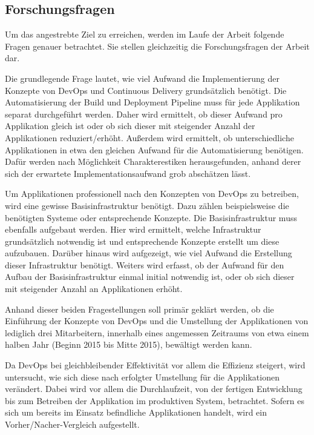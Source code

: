 \subsection{Forschungsfragen}
\label{sec:forschungsfragen}
Um das angestrebte Ziel zu erreichen, werden im Laufe der Arbeit folgende Fragen genauer betrachtet. Sie stellen gleichzeitig die Forschungsfragen der Arbeit dar.

Die grundlegende Frage lautet, wie viel Aufwand die Implementierung der Konzepte von DevOps und Continuous Delivery grundsätzlich benötigt. Die Automatisierung der Build und Deployment Pipeline muss für jede Applikation separat durchgeführt werden. Daher wird ermittelt, ob dieser Aufwand pro Applikation gleich ist oder ob sich dieser mit steigender Anzahl der Applikationen reduziert/erhöht. Außerdem wird ermittelt, ob unterschiedliche Applikationen in etwa den gleichen Aufwand für die Automatisierung benötigen. Dafür werden nach Möglichkeit Charakterestiken herausgefunden, anhand derer sich der erwartete Implementationsaufwand grob abschätzen lässt.

Um Applikationen professionell nach den Konzepten von DevOps zu betreiben, wird eine gewisse Basisinfrastruktur benötigt. Dazu zählen beispielsweise die benötigten Systeme oder entsprechende Konzepte. Die Basisinfrastruktur muss ebenfalls aufgebaut werden. Hier wird ermittelt, welche Infrastruktur grundsätzlich notwendig ist und entsprechende Konzepte erstellt um diese aufzubauen. Darüber hinaus wird aufgezeigt, wie viel Aufwand die Erstellung dieser Infrastruktur benötigt. Weiters wird erfasst, ob der Aufwand für den Aufbau der Basisinfrastruktur einmal initial notwendig ist, oder ob sich dieser mit steigender Anzahl an Applikationen erhöht.

Anhand dieser beiden Fragestellungen soll primär geklärt werden, ob die Einführung der Konzepte von DevOps und die Umstellung der Applikationen von lediglich drei Mitarbeitern, innerhalb eines angemessen Zeitraums von etwa einem halben Jahr (Beginn 2015 bis Mitte 2015), bewältigt werden kann. 

Da DevOps bei gleichbleibender Effektivität vor allem die Effizienz steigert, wird untersucht, wie sich diese nach erfolgter Umstellung für die Applikationen verändert. Dabei wird vor allem die Durchlaufzeit, von der fertigen Entwicklung bis zum Betreiben der Applikation im produktiven System, betrachtet. Sofern es sich um bereits im Einsatz befindliche Applikationen handelt, wird ein Vorher/Nacher-Vergleich aufgestellt.

